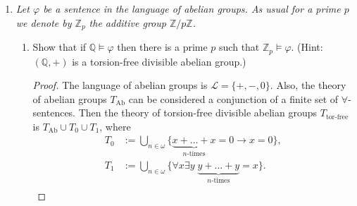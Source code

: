 \documentclass{article}
\begin{document}
\begin{enumerate}[label={\bf Q\arabic*:}]
\begin{enumerate}[label={\bf(\arabic*)}]
\begin{proof}
          \[\begin{array}{lrlr}
            &\mathcal{M} &\models\forall\bar{x}\;
              \neg\varphi(\bar{x},\bar{m}) \\
            \Rightarrow &T_\mathcal{M} &\models\forall\bar{x}\;
              \neg\varphi(\bar{x},\bar{m}) \\
            \Rightarrow &\text{Diag}(\mathcal{M})\cup T
              &\models\forall\bar{x}\; \neg\varphi(\bar{x},\bar{m})
              &(\because\text{Diag}(\mathcal{M})\cup T\models
              T_\mathcal{M}\; \text{by completeness assumption}) \\
            \Rightarrow &\text{Diag}(\mathcal{N})\cup T
              &\models\forall\bar{x}\; \neg\varphi(\bar{x},\bar{m})
              &(\because\text{Diag}(\mathcal{M})\subseteq
              \text{Diag}(\mathcal{N})\; \text{from}\;
              \mathcal{M}<\mathcal{N}) \\
            \Rightarrow &\mathcal{N} &\models\forall\bar{x}\;
              \neg\varphi(\bar{x},\bar{m}) \\
            \Rightarrow &\mathcal{N} &\not\models\exists\bar{x}\;
              \varphi(\bar{x},\bar{m}), \\
          \end{array}\]
          a contradiction.
        \end{proof}
    \end{enumerate}

  \item \it Let $\varphi$ be a sentence in the language of abelian groups.
    As usual for a prime $p$ we denote by $\mathbb{Z}_p$ the additive group
    $\mathbb{Z}/p\mathbb{Z}$.

    \begin{enumerate}[label={\bf(\arabic*)}]
      \item Show that if $\mathbb{Q}\models\varphi$ then there is a prime
        $p$ such that $\mathbb{Z}_p\models\varphi$. (Hint: $(\mathbb{Q},+)$
        is a torsion-free divisible abelian group.)

        \begin{proof}
          The language of abelian groups is $\mathcal{L}=\{+,-,0\}$.
          Also, the theory of abelian groups $T_\text{Ab}$ can be
          considered a conjunction of a finite set of $\forall$-sentences.
          Then the theory of torsion-free divisible abelian groups
          $T_\text{tor-free}$ is $T_\text{Ab}\cup T_0 \cup T_1$, where
          \begin{align*}
            T_0 &:= \bigcup_{n\in\omega}
              \{\underbrace{x+\ldots+x}_{n\text{-times}}=0 \rightarrow
              x=0\}, \\
            T_1 &:= \bigcup_{n\in\omega}
              \{\forall x\exists y\;
              \underbrace{y+\ldots+y}_{n\text{-times}}=x\}. \\
          \end{align*}


\end{proof}
\end{enumerate}
\end{enumerate}
\end{document}
